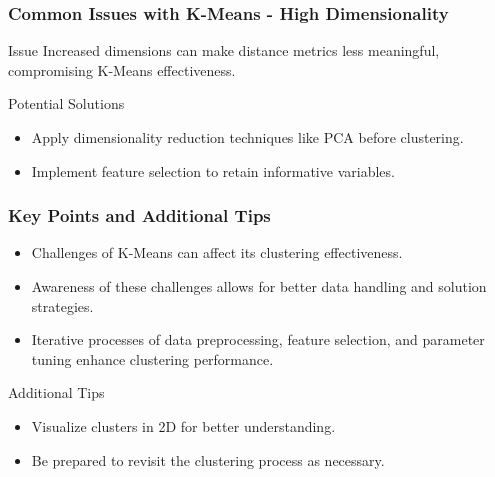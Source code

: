\documentclass[aspectratio=169]{beamer}
\begin{document}
\begin{frame}[fragile]
    \frametitle{Common Issues with K-Means - High Dimensionality}
    \begin{block}{Issue}
        Increased dimensions can make distance metrics less meaningful, compromising K-Means effectiveness.
    \end{block}
    \begin{block}{Potential Solutions}
        \begin{itemize}
            \item Apply dimensionality reduction techniques like PCA before clustering.
            \item Implement feature selection to retain informative variables.
        \end{itemize}
    \end{block}
\end{frame}

\begin{frame}[fragile]
    \frametitle{Key Points and Additional Tips}
    \begin{itemize}
        \item Challenges of K-Means can affect its clustering effectiveness.
        \item Awareness of these challenges allows for better data handling and solution strategies.
        \item Iterative processes of data preprocessing, feature selection, and parameter tuning enhance clustering performance.
    \end{itemize}
    \begin{block}{Additional Tips}
        \begin{itemize}
            \item Visualize clusters in 2D for better understanding.
            \item Be prepared to revisit the clustering process as necessary.
        \end{itemize}
    \end{block}
\end{frame}
\end{document}
